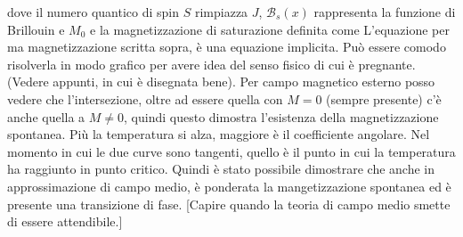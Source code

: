 dove il numero quantico di spin $S$ rimpiazza $J$, $\mathcal{B}_s(x) $ rappresenta la funzione di Brillouin e $M_0$ e la magnetizzazione di saturazione definita come 
L'equazione per ma magnetizzazione scritta sopra, \`e una equazione implicita. Pu\`o essere comodo risolverla in modo grafico per avere idea del senso fisico di cui \`e pregnante. (Vedere appunti, in cui \`e disegnata bene). Per campo magnetico esterno posso vedere che l'intersezione, oltre ad essere quella con $M=0$ (sempre presente) c'\`e anche quella a $M\neq 0$, quindi questo dimostra l'esistenza della magnetizzazione spontanea. Pi\`u la temperatura si alza, maggiore \`e il coefficiente angolare. Nel momento in cui le due curve sono tangenti, quello \`e il punto in cui la temperatura ha raggiunto in punto critico. Quindi \`e stato possibile dimostrare che anche in approssimazione di campo medio, \`e ponderata la mangetizzazione spontanea ed \`e presente una transizione di fase. [Capire quando la teoria di campo medio smette di essere attendibile.]





